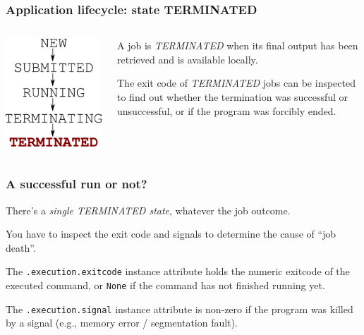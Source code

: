 \documentclass[english,serif,mathserif,xcolor=pdftex,dvipsnames,table]{beamer}
\begin{document}
\begin{frame}[fragile]
\frametitle{Application lifecycle: state TERMINATED}
\begin{columns}[c]
  \begin{column}{0.5\textwidth}
    \includegraphics[height=0.7\textheight]{fig/state-TERMINATED}
  \end{column}
  \begin{column}{0.4\textwidth}
    \raggedleft

    A job is \emph{TERMINATED} when its final output has been
    retrieved and is available locally.

    \+
    The exit code of \emph{TERMINATED} jobs can be inspected to
    find out whether the termination was successful or unsuccessful,
    or if the program was forcibly ended.

  \end{column}
\end{columns}
\end{frame}


\begin{frame}[fragile]
\frametitle{A successful run or not?}

  There's a \emph{single TERMINATED state}, whatever the job outcome.

  \+
  You have to inspect the exit code and signals to determine the
  cause of ``job death''.

  \+
  The \texttt{.execution.exitcode} instance attribute holds the
  numeric exitcode of the executed command, or \texttt{None} if the
  command has not finished running yet.

  \+
  The \texttt{.execution.signal} instance attribute is non-zero if
  the program was killed by a signal (e.g., memory error / segmentation fault).
\end{frame}
\end{document}
